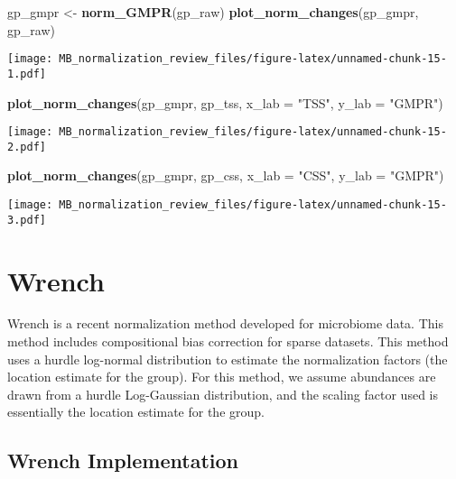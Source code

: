 \documentclass[
]{book}
\newenvironment{Shaded}{\begin{snugshade}}{\end{snugshade}}
\newcommand{\DataTypeTok}[1]{\textcolor[rgb]{0.13,0.29,0.53}{#1}}
\newcommand{\KeywordTok}[1]{\textcolor[rgb]{0.13,0.29,0.53}{\textbf{#1}}}
\newcommand{\NormalTok}[1]{#1}
\newcommand{\StringTok}[1]{\textcolor[rgb]{0.31,0.60,0.02}{#1}}
\begin{document}
\begin{Shaded}
\begin{Highlighting}[]
\NormalTok{gp\_gmpr \textless{}{-}}\StringTok{ }\KeywordTok{norm\_GMPR}\NormalTok{(gp\_raw)}
\KeywordTok{plot\_norm\_changes}\NormalTok{(gp\_gmpr, gp\_raw)}
\end{Highlighting}
\end{Shaded}

\texttt{[image: MB\_normalization\_review\_files/figure-latex/unnamed-chunk-15-1.pdf]}

\begin{Shaded}
\begin{Highlighting}[]
\KeywordTok{plot\_norm\_changes}\NormalTok{(gp\_gmpr, gp\_tss, }\DataTypeTok{x\_lab =} \StringTok{"TSS"}\NormalTok{, }\DataTypeTok{y\_lab =} \StringTok{"GMPR"}\NormalTok{)}
\end{Highlighting}
\end{Shaded}

\texttt{[image: MB\_normalization\_review\_files/figure-latex/unnamed-chunk-15-2.pdf]}

\begin{Shaded}
\begin{Highlighting}[]
\KeywordTok{plot\_norm\_changes}\NormalTok{(gp\_gmpr, gp\_css, }\DataTypeTok{x\_lab =} \StringTok{"CSS"}\NormalTok{, }\DataTypeTok{y\_lab =} \StringTok{"GMPR"}\NormalTok{)}
\end{Highlighting}
\end{Shaded}

\texttt{[image: MB\_normalization\_review\_files/figure-latex/unnamed-chunk-15-3.pdf]}

\hypertarget{wrench}{%
\chapter{Wrench}\label{wrench}}

Wrench is a recent normalization method developed for microbiome data. This method includes compositional bias correction for sparse datasets. This method uses a hurdle log-normal distribution to estimate the normalization factors (the location estimate for the group). For this method, we assume abundances are drawn from a hurdle Log-Gaussian distribution, and the scaling factor used is essentially the location estimate for the group.

\hypertarget{wrench-implementation}{%
\section{Wrench Implementation}\label{wrench-implementation}}
\end{document}
